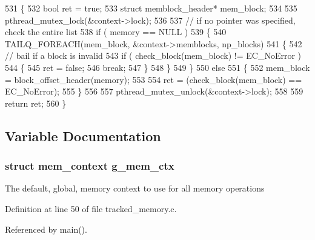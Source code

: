 \begin{DoxyCode}
531 \{
532         \textcolor{keywordtype}{bool}    ret = \textcolor{keyword}{true};
533         \textcolor{keyword}{struct }memblock_header* mem\_block;
534 
535         pthread\_mutex\_lock(&context->lock);
536 
537         \textcolor{comment}{// if no pointer was specified, check the entire list}
538         \textcolor{keywordflow}{if} ( memory == NULL )
539         \{
540                 TAILQ_FOREACH(mem\_block, &context->memblocks, np\_blocks)
541                 \{
542                         \textcolor{comment}{// bail if a block is invalid}
543                         \textcolor{keywordflow}{if} ( check_block(mem\_block) != EC_NoError )
544                         \{
545                                 ret = \textcolor{keyword}{false};
546                                 \textcolor{keywordflow}{break};
547                         \}
548                 \}
549         \}
550         \textcolor{keywordflow}{else}
551         \{
552                 mem\_block = block_offset_header(memory);
553 
554                 ret = (check_block(mem\_block) == EC_NoError);
555         \}
556 
557         pthread\_mutex\_unlock(&context->lock);
558 
559         \textcolor{keywordflow}{return} ret;
560 \}
\end{DoxyCode}


\subsection{Variable Documentation}
\subsubsection[{g\-\_\-mem\-\_\-ctx}]{\setlength{\rightskip}{0pt plus 5cm}struct {\bf mem\-\_\-context} g\-\_\-mem\-\_\-ctx}\label{tracked__memory_8h_a7d7857f56a1eceeb304e53870738e18f}
The default, global, memory context to use for all memory operations 

Definition at line 50 of file tracked\-\_\-memory.\-c.



Referenced by main().

